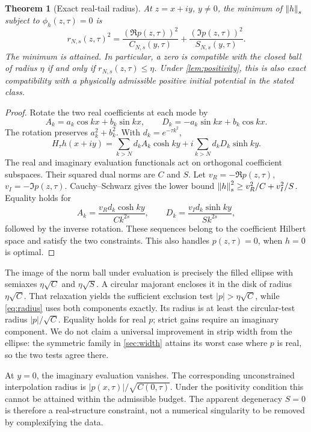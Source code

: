 \documentclass[11pt]{article}
\newtheorem{theorem}{Theorem}\newtheorem{proposition}[theorem]{Proposition}\newtheorem{corollary}[theorem]{Corollary}\newtheorem{lemma}[theorem]{Lemma}\theoremstyle{remark}\newtheorem{remark}[theorem]{Remark}
\begin{document}
\begin{theorem}[Exact real-tail radius]\label{thm:radius}
At $z=x+iy$, $y\ne0$, the minimum of $\left\lVert h\right\rVert_s$ subject to $\phi_h(z,\tau)=0$ is
\begin{equation}\label{eq:radius}
 r_{N,s}(z,\tau)^2=
 \frac{(\Re p(z,\tau))^2}{C_{N,s}(y,\tau)}+
 \frac{(\Im p(z,\tau))^2}{S_{N,s}(y,\tau)}.
\end{equation}
The minimum is attained. In particular, a zero is compatible with the closed ball of radius $\eta$ if and only if $r_{N,s}(z,\tau)\le\eta$. Under \cref{lem:positivity}, this is also exact compatibility with a physically admissible positive initial potential in the stated class.
\end{theorem}
\begin{proof}
Rotate the two real coefficients at each mode by
\[
 A_k=a_k\cos kx+b_k\sin kx,\qquad
 D_k=-a_k\sin kx+b_k\cos kx.
\]
The rotation preserves $a_k^2+b_k^2$. With $d_k=e^{-\tau k^2}$,
\[
 H_\tau h(x+iy)=\sum_{k>N}d_k A_k\cosh ky
       +i\sum_{k>N}d_k D_k\sinh ky.
\]
The real and imaginary evaluation functionals act on orthogonal coefficient subspaces. Their squared dual norms are $C$ and $S$. Let $v_R=-\Re p(z,\tau)$, $v_I=-\Im p(z,\tau)$. Cauchy--Schwarz gives the lower bound $\left\lVert h\right\rVert_s^2\ge v_R^2/C+v_I^2/S$. Equality holds for
\begin{equation}\label{eq:witness}
 A_k=\frac{v_R d_k\cosh ky}{Ck^{2s}},\qquad
 D_k=\frac{v_I d_k\sinh ky}{Sk^{2s}},
\end{equation}
followed by the inverse rotation. These sequences belong to the coefficient Hilbert space and satisfy the two constraints. This also handles $p(z,\tau)=0$, when $h=0$ is optimal.
\end{proof}

The image of the norm ball under evaluation is precisely the filled ellipse with semiaxes $\eta\sqrt C$ and $\eta\sqrt S$. A circular majorant encloses it in the disk of radius $\eta\sqrt C$. That relaxation yields the sufficient exclusion test $|p|>\eta\sqrt C$, while \eqref{eq:radius} uses both components exactly. Its radius is at least the circular-test radius $|p|/\sqrt C$. Equality holds for real $p$; strict gains require an imaginary component. We do not claim a universal improvement in strip width from the ellipse: the symmetric family in \cref{sec:width} attains its worst case where $p$ is real, so the two tests agree there.

At $y=0$, the imaginary evaluation vanishes. The corresponding unconstrained interpolation radius is $|p(x,\tau)|/\sqrt{C(0,\tau)}$. Under the positivity condition this cannot be attained within the admissible budget. The apparent degeneracy $S=0$ is therefore a real-structure constraint, not a numerical singularity to be removed by complexifying the data.
\end{document}

